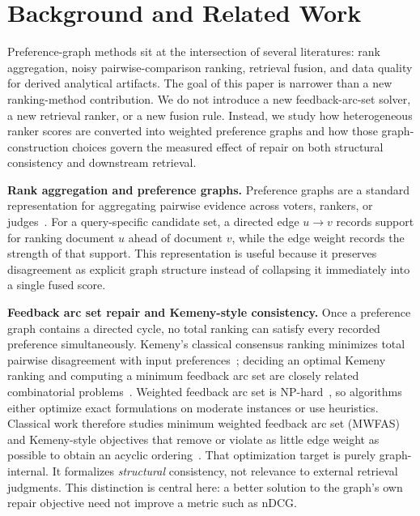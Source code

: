 \documentclass[manuscript,anonymous,review]{acmart}
\begin{document}
\section{Background and Related Work}
\label{sec:background}

Preference-graph methods sit at the intersection of several literatures:
rank aggregation, noisy pairwise-comparison ranking, retrieval fusion, and
data quality for derived analytical artifacts. The goal of this paper
is narrower than a new ranking-method contribution. We do not introduce a new
feedback-arc-set solver, a new retrieval ranker, or a new fusion rule.
Instead, we study how heterogeneous ranker scores are converted into weighted
preference graphs and how those graph-construction choices govern the measured
effect of repair on both structural consistency and downstream retrieval.

\textbf{Rank aggregation and preference graphs.} Preference graphs are a
standard representation for aggregating pairwise evidence across voters,
rankers, or judges~\cite{dwork2001rank,ailon2008aggregating,negahban2017rankcentrality}.
For a query-specific candidate set, a directed edge $u \rightarrow v$ records
support for ranking document $u$ ahead of document $v$, while the edge weight
records the strength of that support. This representation is useful because it
preserves disagreement as explicit graph structure instead of collapsing it
immediately into a single fused score.

\textbf{Feedback arc set repair and Kemeny-style consistency.} Once a
preference graph contains a directed cycle, no total ranking can satisfy every
recorded preference simultaneously. Kemeny's classical consensus ranking
minimizes total pairwise disagreement with input preferences~\cite{kemeny1959mathematics};
deciding an optimal Kemeny ranking and computing a minimum feedback arc set
are closely related combinatorial problems~\cite{dwork2001rank,ailon2008aggregating}.
Weighted feedback arc set is NP-hard~\cite{karp1972reducibility}, so
algorithms either optimize exact formulations on moderate instances or use
heuristics. Classical work therefore studies minimum weighted feedback arc set
(MWFAS) and Kemeny-style objectives that remove or violate as little edge
weight as possible to obtain an acyclic
ordering~\cite{dwork2001rank,ailon2008aggregating,kenyon2007fewerrors,fagin2003comparing}.
That optimization target is purely graph-internal. It formalizes
\emph{structural} consistency, not relevance to external retrieval judgments.
This distinction is central here: a better solution to the graph's own repair
objective need not improve a metric such as nDCG.
\end{document}
